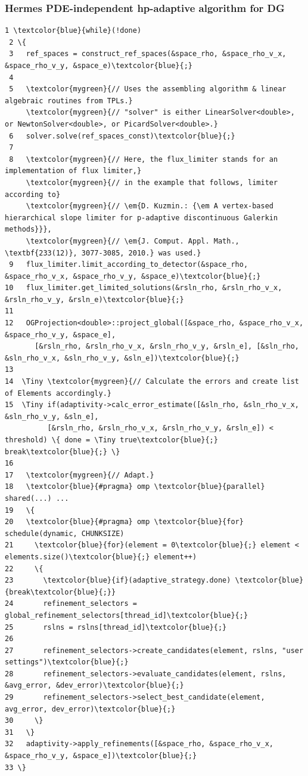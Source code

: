 \documentclass{beamer}
\begin{document}
\begin{frame}[fragile]
\frametitle{Hermes PDE-independent hp-adaptive algorithm for DG}
\begin{Verbatim}[commandchars=\\\{\}, fontsize=\Tinyc]
 1 \textcolor{blue}{while}(!done)
 2 \{
 3   ref_spaces = construct_ref_spaces(&space_rho, &space_rho_v_x, &space_rho_v_y, &space_e)\textcolor{blue}{;}
 4
 5   \textcolor{mygreen}{// Uses the assembling algorithm & linear algebraic routines from TPLs.}
     \textcolor{mygreen}{// "solver" is either LinearSolver<double>, or NewtonSolver<double>, or PicardSolver<double>.}
 6   solver.solve(ref_spaces_const)\textcolor{blue}{;}
 7   
 8   \textcolor{mygreen}{// Here, the flux_limiter stands for an implementation of flux limiter,}
     \textcolor{mygreen}{// in the example that follows, limiter according to}
     \textcolor{mygreen}{// \em{D. Kuzmin.: {\em A vertex-based hierarchical slope limiter for p-adaptive discontinuous Galerkin methods}}}, 
     \textcolor{mygreen}{// \em{J. Comput. Appl. Math., \textbf{233(12)}, 3077-3085, 2010.} was used.}
 9   flux_limiter.limit_according_to_detector(&space_rho, &space_rho_v_x, &space_rho_v_y, &space_e)\textcolor{blue}{;}
10   flux_limiter.get_limited_solutions(&rsln_rho, &rsln_rho_v_x, &rsln_rho_v_y, &rsln_e)\textcolor{blue}{;}
11
12   OGProjection<double>::project_global([&space_rho, &space_rho_v_x, &space_rho_v_y, &space_e],
       [&rsln_rho, &rsln_rho_v_x, &rsln_rho_v_y, &rsln_e], [&sln_rho, &sln_rho_v_x, &sln_rho_v_y, &sln_e])\textcolor{blue}{;}
13
14  \Tiny \textcolor{mygreen}{// Calculate the errors and create list of Elements accordingly.}
15  \Tiny if(adaptivity->calc_error_estimate([&sln_rho, &sln_rho_v_x, &sln_rho_v_y, &sln_e],
          [&rsln_rho, &rsln_rho_v_x, &rsln_rho_v_y, &rsln_e]) < threshold) \{ done = \Tiny true\textcolor{blue}{;} break\textcolor{blue}{;} \}
16 
17   \textcolor{mygreen}{// Adapt.}
18   \textcolor{blue}{#pragma} omp \textcolor{blue}{parallel} shared(...) ...
19   \{
20   \textcolor{blue}{#pragma} omp \textcolor{blue}{for} schedule(dynamic, CHUNKSIZE)
21     \textcolor{blue}{for}(element = 0\textcolor{blue}{;} element < elements.size()\textcolor{blue}{;} element++)
22     \{
23       \textcolor{blue}{if}(adaptive_strategy.done) \textcolor{blue}{break\textcolor{blue}{;}}
24       refinement_selectors = global_refinement_selectors[thread_id]\textcolor{blue}{;}
25       rslns = rslns[thread_id]\textcolor{blue}{;}
26       
27       refinement_selectors->create_candidates(element, rslns, "user settings")\textcolor{blue}{;}
28       refinement_selectors->evaluate_candidates(element, rslns, &avg_error, &dev_error)\textcolor{blue}{;}
29       refinement_selectors->select_best_candidate(element, avg_error, dev_error)\textcolor{blue}{;}
30     \}
31   \}
32   adaptivity->apply_refinements([&space_rho, &space_rho_v_x, &space_rho_v_y, &space_e])\textcolor{blue}{;}
33 \}
\end{Verbatim}
\end{frame}
\end{document}
